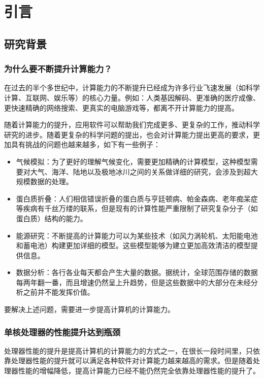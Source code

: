 
\chapter{引言}
\label{chap:intro1}

\section{研究背景}

\subsection{为什么要不断提升计算能力？}

在过去的半个多世纪中，计算能力的不断提升已经成为许多行业飞速发展（如科学计算、互联网、娱乐等）的核心力量。例如：人类基因解码、更准确的医疗成像、更快速精确的网络搜索、更真实的电脑游戏等，都离不开计算能力的提高。

随着计算能力的提升，应用软件可以帮助我们完成更多、更复杂的工作，推动科学研究的进步。随着更复杂的科学问题的提出，也会对计算能力提出更高的要求，更加具有挑战的问题也越来越多，如下有一些例子：

\begin{itemize}
	\item 气候模拟：为了更好的理解气候变化，需要更加精确的计算模型，这种模型需要对大气、海洋、陆地以及极地冰川之间的关系做详细的研究，会涉及到超大规模数据的处理。
	\item 蛋白质折叠：人们相信错误折叠的蛋白质与亨廷顿病、帕金森病、老年痴呆症等疾病有千丝万缕的联系，但是现有的计算性能严重限制了研究复杂分子（如蛋白质）结构的能力。
	\item 能源研究：不断提高的计算能力可以为某些技术（如风力涡轮机、太阳能电池和蓄电池）构建更加详细的模型。这些模型能够为建立更加高效清洁的模型提供信息。
	\item 数据分析：各行各业每天都会产生大量的数据。据统计，全球范围存储的数据每两年翻一番，而且增速仍然呈上升趋势，但是这些数据中的大部分在未经分析之前并不能发挥价值。
\end{itemize}

要解决上述问题，需要进一步提高计算机的计算能力\citep{pacheco2011introduction}。

\subsection{单核处理器的性能提升达到瓶颈}

处理器性能的提升是提高计算机的计算能力的方式之一，在很长一段时间里，只依靠处理器性能的提升就可以满足各种软件对计算能力越来越高的需求。但是随着处理器性能的增幅降低，提高计算能力已经不能仍然完全依靠处理器性能的提升了。

